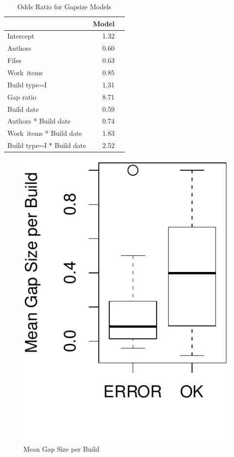 \begin{table}[t]
\begin{center}
\begin{tabular}{lrr}
  \toprule
 & Model\\ 
  \midrule
Intercept & 1.32 \\ 
  Authors &  0.60 \\ 
  Files &  0.63 \\ 
  Work~items  & 0.85 \\ 
  Build type=I  & 1.31 \\ 
  Gap ratio  & 8.71 \\ 
  Build date  & 0.59 \\ 
  Authors * Build date & 0.74 \\ 
  Work~items * Build date  & 1.83 \\ 
  Build type=I * Build date  & 2.52 \\ 
   \bottomrule
\end{tabular}
\caption{Odds Ratio for Gapsize Models}
\label{tab:oddsratio_gapsize}
\end{center}
\end{table}


\begin{figure}[t]
	\centering	
	\includegraphics[width=.5\columnwidth]{figures/boxplot_meangapsize}
	\caption{Mean Gap Size per Build}
	\label{fig:gapsizes}
\end{figure}

